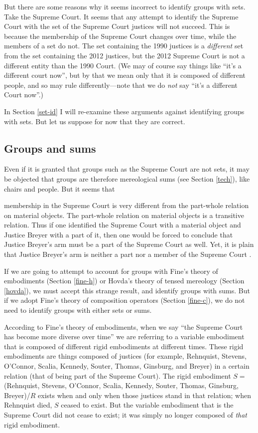 \documentclass[11pt]{article}
\newenvironment{squote}{%
\begin{spacing}{1}
\begin{list}{}{%
\setlength{\labelwidth}{0pt}%
\rightmargin\leftmargin%
}
\item\relax
}{%
\end{list}%
\end{spacing}
}
\begin{document}
\begin{spacing}{1.5}
But there are some reasons why it seems incorrect to identify groups
with sets.  Take the Supreme Court.  It seems that any attempt to
identify the Supreme Court with the set of the Supreme Court justices
will not succeed.  This is because the membership of the Supreme Court
changes over time, while the members of a set do not.  The set
containing the 1990 justices is a {\em different} set from the set
containing the 2012 justices, but the 2012 Supreme Court is not a
different entity than the 1990 Court.  (We may of course say things
like ``it's a different court now'', but by that we mean only that it
is composed of different people, and so may rule differently---note
that we do {\em not} say ``it's a different Court now''.)

In Section \ref{set-id} I will re-examine these arguments against
identifying groups with sets.  But let us suppose for now that they
are correct.

\subsection{Groups and sums}
\label{group-sum}
Even if it is granted that groups such as the Supreme Court are not
sets, it may be objected that groups are therefore mereological sums
(see Section \ref{tech}), like chairs and people.  But it seems that

\begin{squote}
membership in the Supreme Court is very different from
the part-whole relation on material objects.  The part-whole relation
on material objects is a transitive relation.  Thus if one identified
the Supreme Court with a material object and Justice Breyer with a
part of it, then one would be forced to conclude that Justice Breyer's
arm must be a part of the Supreme Court as well.  Yet, it is plain
that Justice Breyer's arm is neither a part nor a member of the
Supreme Court \citep[136--137]{uzquiano2004a}.
\end{squote}

If we are going to attempt to account for groups with Fine's theory of
embodiments (Section \ref{fine-h}) or Hovda's theory of tensed
mereology (Section \ref{hovda}), we must accept this strange result,
and identify groups with sums.  But if we adopt Fine's theory of
composition operators (Section \ref{fine-c}), we do not need to
identify groups with either sets or sums.

According to Fine's theory of embodiments, when we say ``the Supreme
Court has become more diverse over time'' we are referring to a
variable embodiment that is composed of different rigid embodiments at
different times.  These rigid embodiments are things composed of
justices (for example, Rehnquist, Stevens, O'Connor, Scalia, Kennedy,
Souter, Thomas, Ginsburg, and Breyer) in a certain relation (that of
being part of the Supreme Court).  The rigid embodiment $S =$
(Rehnquist, Stevens, O'Connor, Scalia, Kennedy, Souter, Thomas,
Ginsburg, Breyer)/$R$ exists when and only when those justices stand
in that relation; when Rehnquist died, $S$ ceased to exist.  But the
variable embodiment that is the Supreme Court did not cease to exist;
it was simply no longer composed of {\em that} rigid embodiment.


\end{spacing}
\end{document}
